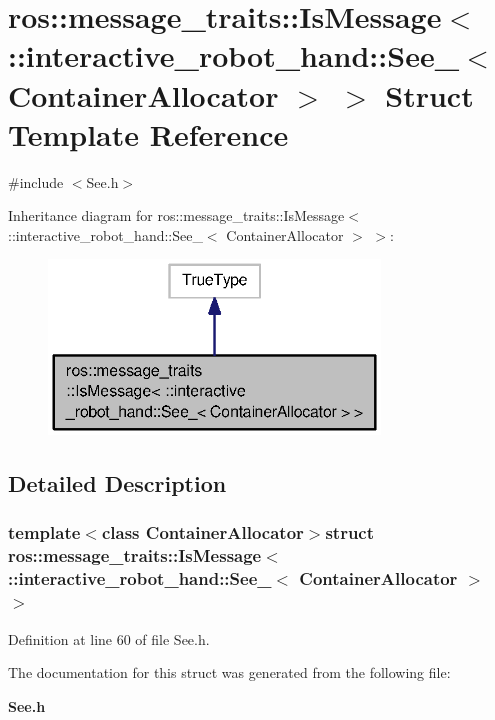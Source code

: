 \section{ros\-:\-:message\-\_\-traits\-:\-:Is\-Message$<$ \-:\-:interactive\-\_\-robot\-\_\-hand\-:\-:See\-\_\-$<$ Container\-Allocator $>$ $>$ Struct Template Reference}
\label{structros_1_1message__traits_1_1IsMessage_3_01_1_1interactive__robot__hand_1_1See___3_01ContainerAllocator_01_4_01_4}


{\ttfamily \#include $<$See.\-h$>$}



Inheritance diagram for ros\-:\-:message\-\_\-traits\-:\-:Is\-Message$<$ \-:\-:interactive\-\_\-robot\-\_\-hand\-:\-:See\-\_\-$<$ Container\-Allocator $>$ $>$\-:
\nopagebreak
\begin{figure}[H]
\begin{center}
\leavevmode
\includegraphics[width=250pt]{structros_1_1message__traits_1_1IsMessage_3_01_1_1interactive__robot__hand_1_1See___3_01Containeed6d7ccd8c9d6d241ceda1a85c145c72}
\end{center}
\end{figure}


\subsection{Detailed Description}
\subsubsection*{template$<$class Container\-Allocator$>$struct ros\-::message\-\_\-traits\-::\-Is\-Message$<$ \-::interactive\-\_\-robot\-\_\-hand\-::\-See\-\_\-$<$ Container\-Allocator $>$ $>$}



Definition at line 60 of file See.\-h.



The documentation for this struct was generated from the following file\-:\begin{DoxyCompactItemize}
\item 
{\bf See.\-h}\end{DoxyCompactItemize}
